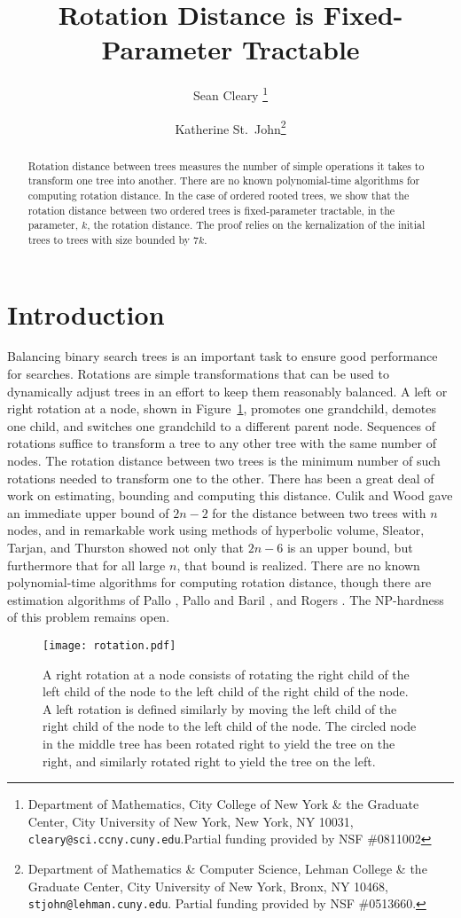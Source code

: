 \documentclass[12pt]{article}
\title{Rotation Distance is Fixed-Parameter Tractable}
\author{Sean Cleary
\thanks{
	Department of Mathematics,
	City College of New York \& the Graduate Center,
	City University of New York,  New York, NY 10031,
	{\tt cleary@sci.ccny.cuny.edu}.Partial funding provided by NSF \#0811002
}
\and 
Katherine St.~John\thanks{
	Department of Mathematics \& Computer Science,
	Lehman College \& the Graduate Center,
        	City University of New York, Bronx, NY 10468,
         {\tt stjohn@lehman.cuny.edu}.  Partial funding provided by NSF  \#0513660.
}
}
\begin{document}
\maketitle

\begin{abstract}
Rotation distance between trees measures the 
number of simple operations it takes to transform one 
tree into another.  There are no known polynomial-time
algorithms for computing rotation distance.
   In the case of ordered rooted  trees,
we show that the rotation distance between two ordered
trees is fixed-parameter tractable, in the parameter, $k$,
the rotation distance.  The proof relies on the kernalization
of the initial trees to trees with size bounded by $7k$.
\end{abstract}

\section{Introduction}

Balancing binary search trees is an important task to ensure good performance for searches.
Rotations are simple transformations that can be used to dynamically adjust trees in an effort to keep
them reasonably balanced.  A left or right rotation at a node, shown in Figure~\ref{rot}, promotes one grandchild, demotes one child, and switches one grandchild to a different parent node.  Sequences of rotations suffice to transform a tree to any other tree with the same number of nodes. The rotation distance between two trees is the minimum number of such rotations needed to transform one to the other.
There has been a great deal of work on estimating, bounding and computing this distance.
Culik and Wood \cite{cw} gave an immediate upper bound of $2n-2$ for the distance between two trees with $n$ nodes, and in remarkable work using methods of hyperbolic volume, Sleator, Tarjan, and Thurston \cite{stt} showed not only that $2n-6$ is an upper bound, but furthermore that for all large $n$, that bound is realized.  There are no known polynomial-time algorithms for computing
rotation distance, though there are estimation algorithms of Pallo \cite{pallo}, Pallo and Baril \cite{barilpallo},
and Rogers \cite{rogers}.  The NP-hardness of this problem remains open.

\begin{figure}
\begin{center}
\texttt{[image: rotation.pdf]}
\end{center}
\caption{\small A right
rotation at a node consists of rotating the right child of the left child of the 
node to the left child of the right child of the node.  A left rotation is defined similarly by
moving the left child of the right child of the node to the left child of the node.
The circled node in the middle tree has been rotated right to yield the
tree on the right, and similarly rotated right to yield the tree on the left.  }
\label{rot}
\end{figure}
\end{document}
